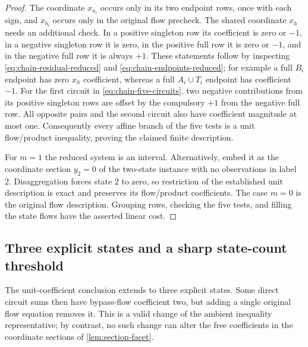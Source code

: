 \begin{proof}
The coordinate $x_{a_i}$ occurs only in its two endpoint rows,
once with each sign, and $x_{b_i}$ occurs only in the original
flow precheck. The shared coordinate $x_h$ needs an additional
check. In a positive singleton row its coefficient is zero or
$-1$, in a negative singleton row it is zero, in the positive
full row it is zero or $-1$, and in the negative full row it is
always $+1$. These statements follow by inspecting
\eqref{eq:chain-residual-reduced} and
\eqref{eq:chain-endpoints-reduced}; for example a full $B_i$
endpoint has zero $x_h$ coefficient, whereas a full $A_i\cup T_i$
endpoint has coefficient $-1$.
For the first circuit in \eqref{eq:chain-five-circuits}, two
negative contributions from its positive singleton rows are offset by the compulsory
$+1$ from the negative full row. All opposite pairs and the
second circuit also have coefficient magnitude at most one.
Consequently every affine branch of the five tests is a unit
flow/product inequality, proving the claimed finite description.

For $m=1$ the reduced system is an interval. Alternatively, embed
it as the coordinate section $y_2=0$ of the two-state instance
with no observations in label 2. Disaggregation forces state 2
to zero, so restriction of the established unit description is
exact and preserves its flow/product coefficients. The case $m=0$
is the original flow description. Grouping rows, checking the five
tests, and filling the state flows have the asserted linear cost.
\end{proof}

\subsection{Three explicit states and a sharp state-count threshold}

The unit-coefficient conclusion extends to three explicit states. Some
direct circuit sums then have bypass-flow coefficient two, but adding a
single original flow equation removes it. This is a valid change of
the ambient inequality representative; by contrast, no such change can
alter the free coefficients in the coordinate sections of
\cref{lem:section-facet}.

